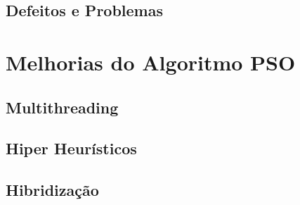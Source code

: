 \subsection{Defeitos e Problemas}
\lipsum[2]

\section{Melhorias do Algoritmo PSO}
\lipsum[2]

\subsection{Multithreading}
\lipsum[2]

\subsection{Hiper Heurísticos}
\lipsum[2]

\subsection{Hibridização}
\lipsum[2]

